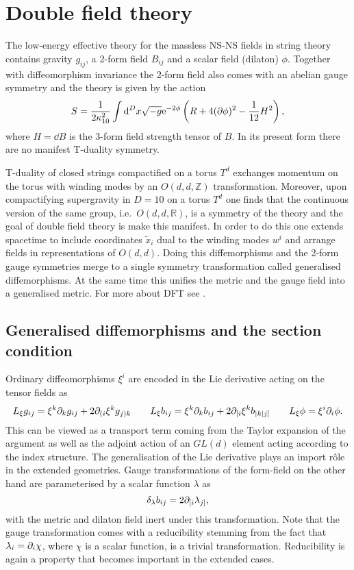 \chapter{Double field theory}\label{sec:DFT}
The low-energy effective theory for the massless NS-NS fields in string theory contains gravity $g_{ij}$, a 2-form field $B_{ij}$ and a scalar field (dilaton) $\phi$. Together with diffeomorphism invariance the 2-form field also comes with an abelian gauge symmetry and the theory is given by the action 
\begin{equation}
    S = \frac{1}{2\kappa_{10}^2}\int \mathrm{d} ^Dx \sqrt{-g}\mathrm{e}^{-2\phi}\left(R+4(\partial\phi)^2-\frac{1}{12}H^2\right),
\end{equation}
where $H=\dd B$ is the 3-form field strength tensor of $B$. In its present form there are no manifest T-duality symmetry. 

T-duality of closed strings compactified on a torus $T^d$ exchanges momentum on the torus with winding modes by an $O(d,d,\mathbb{Z})$ transformation. Moreover, upon compactifying supergravity in $D=10$ on a torus $T^d$ one finds that the continuous version of the same group, i.e.\ $O(d,d,\mathbb{R})$, is a symmetry of the theory and the goal of double field theory is make this manifest. In order to do this one extends spacetime to include coordinates $\tilde{x}_i$ dual to the winding modes $w^i$ and arrange fields in representations of $O(d,d)$. Doing this diffemorphisms and the 2-form gauge symmetries merge to a single symmetry transformation called generalised diffemorphisms. At the same time this unifies the metric and the gauge field into a generalised metric. For more about DFT see \cite{Berman2014,HohmZwiebach2013,DFTHullZwiebach2009,DFTAldazabal2013}. 


\section{Generalised diffemorphisms and the section condition}
Ordinary diffeomorphisms $\xi^i$ are encoded in the Lie derivative acting on the tensor fields as 
\begin{equation}
    L_\xi g_{ij} = \xi^k\partial_kg_{ij}+2\partial_{(i}\xi^kg_{j)k} \qquad L_\xi b_{ij} = \xi^k\partial_k b_{ij} + 2 \partial_{[i}\xi^k b_{|k|j]} \qquad L_\xi \phi = \xi^i\partial_i\phi. 
\end{equation}
This can be viewed as a transport term coming from the Taylor expansion of the argument as well as the adjoint action of an $GL(d)$ element acting according to the index structure. The generalisation of the Lie derivative plays an import rôle in the extended geometries. Gauge transformations of the form-field on the other hand are parameterised by a scalar function $\lambda$ as
\begin{equation}
    \delta_\lambda b_{ij} = 2\partial_{[i}\lambda_{j]},
\end{equation}
with the metric and dilaton field inert under this transformation. Note that the gauge transformation comes with a reducibility stemming from the fact that $\lambda_i = \partial_i \chi$, where $\chi$ is a scalar function, is a trivial transformation. Reducibility is again a property that becomes important in the extended cases. 

